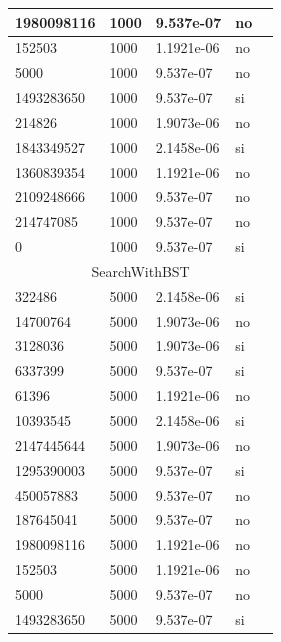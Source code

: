 \documentclass[12pt, fleqn]{article}                             %
\theoremstyle{break}                                            %
\begin{document}
\begin{longtable}{|m{5em}|m{5em}|m{10em}|m{5em}|@{}m{0pt}@{}}
            1980098116& 1000  & 9.537e-07 & no &\\[1em]    \hline
            152503& 1000  & 1.1921e-06 & no &\\[1em]    \hline
            5000& 1000  & 9.537e-07 & no &\\[1em]    \hline
            1493283650& 1000  & 9.537e-07 & si &\\[1em]    \hline
            214826& 1000  & 1.9073e-06 & no &\\[1em]    \hline
            1843349527& 1000  & 2.1458e-06 & si &\\[1em]    \hline
            1360839354& 1000  & 1.1921e-06 & no &\\[1em]    \hline
            2109248666& 1000  & 9.537e-07 & no &\\[1em]    \hline
            214747085& 1000  & 9.537e-07 & no &\\[1em]    \hline
            0& 1000  & 9.537e-07 & si &\\[1em]    \hline
            \multicolumn{5}{|c|}{SearchWithBST}   \\          \hline
            322486& 5000  & 2.1458e-06 & si &\\[1em]    \hline
            14700764& 5000  & 1.9073e-06 & no &\\[1em]    \hline
            3128036& 5000  & 1.9073e-06 & si &\\[1em]    \hline
            6337399& 5000  & 9.537e-07 & si &\\[1em]    \hline
            61396& 5000  & 1.1921e-06 & no &\\[1em]    \hline
            10393545& 5000  & 2.1458e-06 & si &\\[1em]    \hline
            2147445644& 5000  & 1.9073e-06 & no &\\[1em]    \hline
            1295390003& 5000  & 9.537e-07 & si &\\[1em]    \hline
            450057883& 5000  & 9.537e-07 & no &\\[1em]    \hline
            187645041& 5000  & 9.537e-07 & no &\\[1em]    \hline
            1980098116& 5000  & 1.1921e-06 & no &\\[1em]    \hline
            152503& 5000  & 1.1921e-06 & no &\\[1em]    \hline
            5000& 5000  & 9.537e-07 & no &\\[1em]    \hline
            1493283650& 5000  & 9.537e-07 & si &\\[1em]    \hline

\end{longtable}
\end{document}

